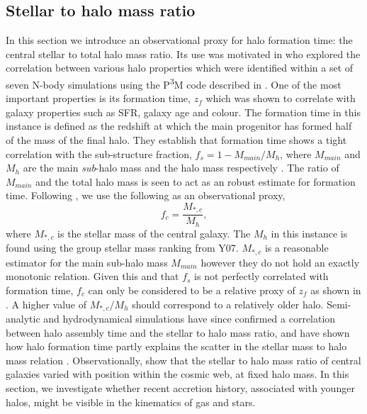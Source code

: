 \subsection{Stellar to halo mass ratio}\label{sec:MsMh_hab}
In this section we introduce an observational proxy for halo formation time: the central stellar to total halo mass ratio. Its use was motivated in \citet{wang2011} who explored the correlation between various halo properties which were identified within a set of seven N-body simulations using the P\textsuperscript{3}M code described in \citet{jing2007}. One of the most important properties is its formation time, $z_f$ which was shown to correlate with galaxy properties such as SFR, galaxy age and colour. The formation time in this instance is defined as the redshift at which the main progenitor has formed half of the mass of the final halo. %
They establish that formation time shows a tight correlation with the sub-structure fraction, $f_s = 1 - M_{main}/M_h$, where $M_{main}$ and $M_h$ are the main \textit{sub}-halo mass and the halo mass respectively \citep{gao2007}. 
The ratio of $M_{main}$ and the total halo mass is seen to act as an robust estimate for formation time. Following \citet{lim2015}, we use the following as an observational proxy,
\begin{equation}
f_c = \frac{M_{*,c}}{M_h},
\end{equation}
where $M_{*,c}$ is the stellar mass of the central galaxy. The $M_h$ in this instance is found using the group stellar mass ranking from Y07. $M_{*,c}$ is a reasonable estimator for the main sub-halo mass $M_{main}$ however they do not hold an exactly monotonic relation. Given this and that $f_s$ is not perfectly correlated with formation time, $f_c$ can only be considered to be a relative proxy of $z_f$ as shown in \citet{lim2015}. A higher value of $M_{*,c}/M_h$ should correspond to a relatively older halo. 
Semi-analytic and hydrodynamical simulations have since confirmed a correlation between halo assembly time and the stellar to halo mass ratio, and have shown how halo formation time partly explains the scatter in the stellar mass to halo mass relation \citep[e.g.][]{matthee2017,tojeiro2017,zehavi2018}. Observationally, \cite{tojeiro2017} show that the stellar to halo mass ratio of central galaxies varied with position within the cosmic web, at fixed halo mass. In this section, we investigate whether recent accretion history, associated with younger halos, might be visible in the kinematics of gas and stars.


